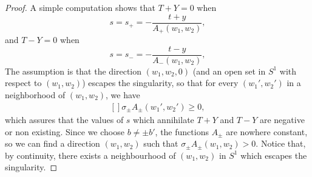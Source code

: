 \begin{proof}
A simple computation shows that $T+Y=0$ when
\begin{equation}
	s=s_+=-\frac{ t+y }{ A_+(w_1,w_2) },
\end{equation}
and $T-Y=0$ when
\begin{equation}
	s=s_-=-\frac{ t-y }{ A_-(w_1,w_2) },
\end{equation}
The assumption is that the direction $(w_1,w_2,0)$ (and an open set in $S^1$ with respect to $(w_1,w_2)$) escapes the singularity, so that for every $(w_1',w_2')$ in a neighborhood of $(w_1,w_2)$, we have
\begin{equation}
	\begin{aligned}[]
		\sigma_{\pm}A_{\pm}(w_1',w_2')\geq 0,
	\end{aligned}
\end{equation}
which assures that the values of $s$ which annihilate $T+Y$ and $T-Y$ are negative or non existing. Since we choose $b\neq \pm b'$, the functions $A_{\pm}$ are nowhere constant, so we can find a direction $(w_1,w_2)$ such that $\sigma_{\pm}A_{\pm}(w_1,w_2)>0$. Notice that, by continuity, there exists a neighbourhood of $(w_1,w_2)$ in $S^1$ which escapes the singularity.


\end{proof}
